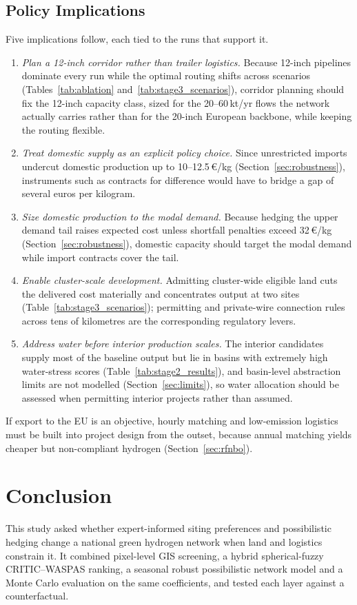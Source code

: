 \documentclass[preprint,12pt,authoryear]{elsarticle}
\begin{document}
\subsection{Policy Implications}
Five implications follow, each tied to the runs that support it.
\begin{enumerate}
    \item \textit{Plan a 12-inch corridor rather than trailer logistics.} Because 12-inch pipelines dominate every run while the optimal routing shifts across scenarios (Tables~\ref{tab:ablation} and~\ref{tab:stage3_scenarios}), corridor planning should fix the 12-inch capacity class, sized for the 20--60\,kt/yr flows the network actually carries rather than for the 20-inch European backbone, while keeping the routing flexible.
    \item \textit{Treat domestic supply as an explicit policy choice.} Since unrestricted imports undercut domestic production up to 10--12.5\,€/kg (Section~\ref{sec:robustness}), instruments such as contracts for difference would have to bridge a gap of several euros per kilogram.
    \item \textit{Size domestic production to the modal demand.} Because hedging the upper demand tail raises expected cost unless shortfall penalties exceed 32\,€/kg (Section~\ref{sec:robustness}), domestic capacity should target the modal demand while import contracts cover the tail.
    \item \textit{Enable cluster-scale development.} Admitting cluster-wide eligible land cuts the delivered cost materially and concentrates output at two sites (Table~\ref{tab:stage3_scenarios}); permitting and private-wire connection rules across tens of kilometres are the corresponding regulatory levers.
    \item \textit{Address water before interior production scales.} The interior candidates supply most of the baseline output but lie in basins with extremely high water-stress scores (Table~\ref{tab:stage2_results}), and basin-level abstraction limits are not modelled (Section~\ref{sec:limits}), so water allocation should be assessed when permitting interior projects rather than assumed.
\end{enumerate}
If export to the EU is an objective, hourly matching and low-emission logistics must be built into project design from the outset, because annual matching yields cheaper but non-compliant hydrogen (Section~\ref{sec:rfnbo}).

\section{Conclusion}
This study asked whether expert-informed siting preferences and possibilistic hedging change a national green hydrogen network when land and logistics constrain it. It combined pixel-level GIS screening, a hybrid spherical-fuzzy CRITIC--WASPAS ranking, a seasonal robust possibilistic network model and a Monte Carlo evaluation on the same coefficients, and tested each layer against a counterfactual.
\end{document}
